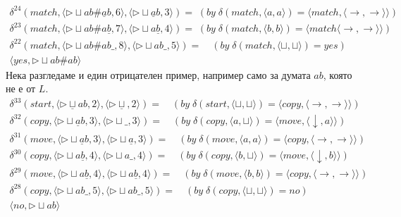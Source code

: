 \documentclass[14pt]{extarticle}
\begin{document}
\begin{align*}
    \delta^{24}(match, \langle \triangleright \sqcup ab \# \underline{a}b, 6 \rangle, \langle \triangleright \sqcup \underline{a}b, 3 \rangle) = \; (by\; \delta(match, \langle a, a \rangle) = \langle match, \langle \rightarrow, \rightarrow \rangle \rangle ) \\
    \delta^{23}(match, \langle \triangleright \sqcup ab \# a\underline{b}, 7 \rangle, \langle \triangleright \sqcup a\underline{b}, 4 \rangle) = \; (by\; \delta(match, \langle b, b \rangle) = \langle match \langle \rightarrow, \rightarrow \rangle \rangle ) \\
    \delta^{22}(match, \langle \triangleright \sqcup ab \# ab\_, 8 \rangle, \langle \triangleright \sqcup ab\_, 5 \rangle) = \quad (by\; \delta(match, \langle \sqcup, \sqcup \rangle) = yes ) \\
    \langle yes, \triangleright \sqcup ab\#ab \rangle
\end{align*}
Нека разгледаме и един отрицателен пример, например само за думата \(ab\), която не е от \(L\).
\begin{align*}
    \delta^{33}(start, \langle \triangleright \underline{\sqcup} ab, 2 \rangle, \langle \triangleright \underline{\sqcup}, 2 \rangle) = \quad (by\; \delta(start, \langle \sqcup, \sqcup \rangle) = \langle copy, \langle \rightarrow, \rightarrow \rangle \rangle) \\
    \delta^{32}(copy, \langle \triangleright \sqcup \underline{a}b, 3 \rangle, \langle \triangleright \sqcup \_, 3 \rangle) = \quad (by\; \delta(copy, \langle a, \sqcup \rangle) = \langle move, \langle \downarrow, a \rangle \rangle ) \\
    \delta^{31}(move, \langle \triangleright \sqcup \underline{a}b, 3 \rangle, \langle \triangleright \sqcup \underline{a}, 3 \rangle) = \quad (by\; \delta(move, \langle a, a \rangle) = \langle copy, \langle \rightarrow, \rightarrow \rangle \rangle ) \\
    \delta^{30}(copy, \langle \triangleright \sqcup a\underline{b}, 4 \rangle, \langle \triangleright \sqcup a \_, 4 \rangle) = \quad (by\; \delta(copy, \langle b, \sqcup \rangle) = \langle move, \langle \downarrow, b \rangle \rangle ) \\
    \delta^{29}(move, \langle \triangleright \sqcup a\underline{b}, 4 \rangle, \langle \triangleright \sqcup a\underline{b}, 4 \rangle) = \quad (by\; \delta(move, \langle b, b \rangle) = \langle copy, \langle \rightarrow, \rightarrow \rangle \rangle ) \\
    \delta^{28}(copy, \langle \triangleright \sqcup ab\_, 5 \rangle, \langle \triangleright \sqcup ab\_, 5 \rangle) = \quad (by\; \delta(copy, \langle \sqcup, \sqcup \rangle) = no ) \\
    \langle no, \triangleright \sqcup ab \rangle
\end{align*}
\end{document}
